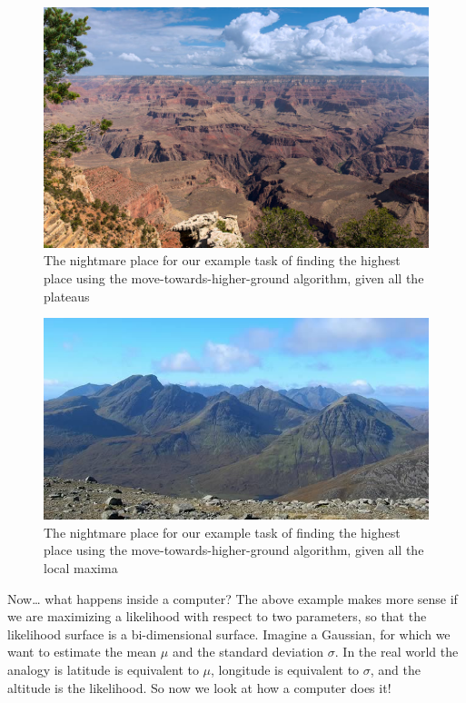 \documentclass[
]{book}
\begin{document}
\begin{figure}
\centering
\includegraphics{extfiles/grand-canyon.jpg}
\caption{The nightmare place for our example task of finding the highest place using the move-towards-higher-ground algorithm, given all the plateaus}
\end{figure}

\begin{figure}
\centering
\includegraphics{extfiles/munros.jpg}
\caption{The nightmare place for our example task of finding the highest place using the move-towards-higher-ground algorithm, given all the local maxima}
\end{figure}

Now\ldots{} what happens inside a computer? The above example makes more sense if we are maximizing a likelihood with respect to two parameters, so that the likelihood surface is a bi-dimensional surface. Imagine a Gaussian, for which we want to estimate the mean \(\mu\) and the standard deviation \(\sigma\). In the real world the analogy is latitude is equivalent to \(\mu\), longitude is equivalent to \(\sigma\), and the altitude is the likelihood. So now we look at how a computer does it!
\end{document}
